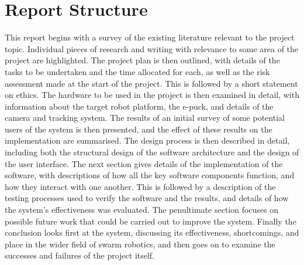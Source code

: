 \section{Report Structure}
This report begins with a survey of the existing literature relevant to the project topic. Individual pieces of research and writing with relevance to some area of the project are highlighted. The project plan is then outlined, with details of the tasks to be undertaken and the time allocated for each, as well as the risk assessment made at the start of the project. This is followed by a short statement on ethics. The hardware to be used in the project is then examined in detail, with information about the target robot platform, the e-puck, and details of the camera and tracking system. The results of an initial survey of some potential users of the system is then presented, and the effect of these results on the implementation are summarised. The design process is then described in detail, including both the structural design of the software architecture and the design of the user interface. The next section gives details of the implementation of the software, with descriptions of how all the key software components function, and how they interact with one another. This is followed by a description of the testing processes used to verify the software and the results, and details of how the system's effectiveness was evaluated. The penultimate section focuses on possible future work that could be carried out to improve the system. Finally the conclusion looks first at the system, discussing its effectiveness, shortcomings, and place in the wider field of swarm robotics, and then goes on to examine the successes and failures of the project itself.